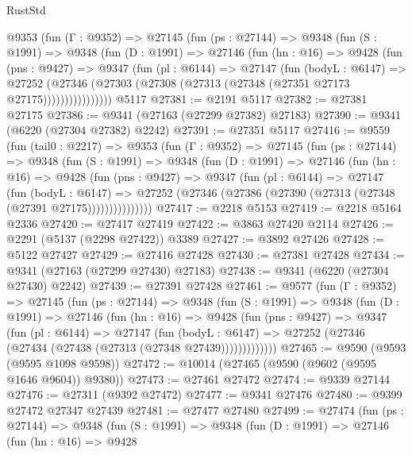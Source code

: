 \begin{lexlean}{RustStd}
\begin{coremodule}
      @9353
        (fun (Γ : @9352) =>
        @27145
          (fun (ps : @27144) =>
          @9348
            (fun (S : @1991) =>
            @9348
              (fun (D : @1991) =>
              @27146
                (fun (hn : @16) =>
                @9428
                  (fun (pns : @9427) =>
                  @9347
                    (fun (pl : @6144) =>
                    @27147
                      (fun (bodyL : @6147) =>
                      @27252
                        (@27346
                          (@27303 (@27308 (@27313 (@27348 (@27351 @27173 @27175))))))))))))))))
    @5117
@27381 := @2191 @5117
@27382 := @27381 @27175
@27386 := @9341 (@27163 (@27299 @27382) @27183)
@27390 := @9341 (@6220 (@27304 @27382) @2242)
@27391 := @27351 @5117
@27416 := @9559
    (fun (tail0 : @2217) =>
    @9353
      (fun (Γ : @9352) =>
      @27145
        (fun (ps : @27144) =>
        @9348
          (fun (S : @1991) =>
          @9348
            (fun (D : @1991) =>
            @27146
              (fun (hn : @16) =>
              @9428
                (fun (pns : @9427) =>
                @9347
                  (fun (pl : @6144) =>
                  @27147
                    (fun (bodyL : @6147) =>
                    @27252 (@27346 (@27386 (@27390 (@27313 (@27348 (@27391 @27175)))))))))))))))
@27417 := @2218 @5153
@27419 := @2218 @5164 @2336
@27420 := @27417 @27419
@27422 := @3863 @27420 @2114
@27426 := @2291 (@5137 (@2298 @27422)) @3389
@27427 := @3892 @27426
@27428 := @5122 @27427
@27429 := @27416 @27428
@27430 := @27381 @27428
@27434 := @9341 (@27163 (@27299 @27430) @27183)
@27438 := @9341 (@6220 (@27304 @27430) @2242)
@27439 := @27391 @27428
@27461 := @9577
    (fun (Γ : @9352) =>
    @27145
      (fun (ps : @27144) =>
      @9348
        (fun (S : @1991) =>
        @9348
          (fun (D : @1991) =>
          @27146
            (fun (hn : @16) =>
            @9428
              (fun (pns : @9427) =>
              @9347
                (fun (pl : @6144) =>
                @27147
                  (fun (bodyL : @6147) =>
                  @27252 (@27346 (@27434 (@27438 (@27313 (@27348 @27439)))))))))))))
@27465 := @9590 (@9593 (@9595 @1098 @9598))
@27472 := @10014 (@27465 (@9590 (@9602 (@9595 @1646 @9604)) @9380))
@27473 := @27461 @27472
@27474 := @9339 @27144
@27476 := @27311 (@9392 @27472)
@27477 := @9341 @27476
@27480 := @9399 @27472 @27347 @27439
@27481 := @27477 @27480
@27499 := @27474
    (fun (ps : @27144) =>
    @9348
      (fun (S : @1991) =>
      @9348
        (fun (D : @1991) =>
        @27146
          (fun (hn : @16) =>
          @9428

\end{coremodule}
\end{lexlean}
